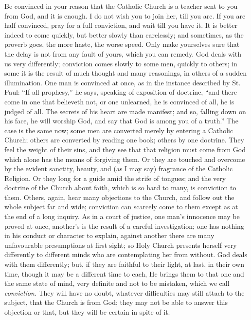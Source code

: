 Be convinced in your reason that the Catholic Church is a teacher
sent to you from God, and it is enough. I do not wish you to join her,
till you are. If you are half convinced, pray for a full conviction,
and wait till you have it. It is better indeed to come quickly, but
better slowly than carelessly; and sometimes, as the proverb goes, the
more haste, the worse speed. Only make yourselves sure that the delay
is not from any fault of yours, which you can remedy. God deals with
us very differently; conviction comes slowly to some men, quickly to
others; in some it is the result of much thought and many reasonings,
in others of a sudden illumination. One man is convinced at once, as
in the instance described by St. Paul: ``If all prophesy,'' he
says, speaking of exposition of doctrine, ``and there come in one
that believeth not, or one unlearned, he is convinced of all, he is
judged of all. The secrets of his heart are made manifest; and so,
falling down on his face, he will worship God, and say that God is
among you of a truth.'' The case is the same now; some men are
converted merely by entering a Catholic Church; others are converted
by reading one book; others by one doctrine. They feel the weight of
their sins, and they see that that religion must come from God which
alone has the means of forgiving them. Or they are touched and
overcome by the evident sanctity, beauty, and (as I may say) fragrance
of the Catholic Religion. Or they long for a guide amid the strife of
tongues; and the very doctrine of the Church about faith, which is so
hard to many, is conviction to them. Others, again, hear many
objections to the Church, and follow out the whole subject far and
wide; conviction can scarcely come to them except as at the end of a
long inquiry. As in a court of justice, one man's innocence may be
proved at once, another's is the result of a careful investigation;
one has nothing in his conduct or character to explain, against
another there are many unfavourable presumptions at first sight; so
Holy Church presents herself very differently to different minds who
are contemplating her from without. God deals with them differently;
but, if they are faithful to their light, at last, in their own time,
though it may be a different time to each, He brings them to that one
and the same state of mind, very definite and not to be mistaken,
which we call \emph{conviction}. They will have no doubt, whatever
difficulties may still attach to the subject, that the Church is from
God; they may not be able to answer this objection or that, but they
will be certain in spite of it.

